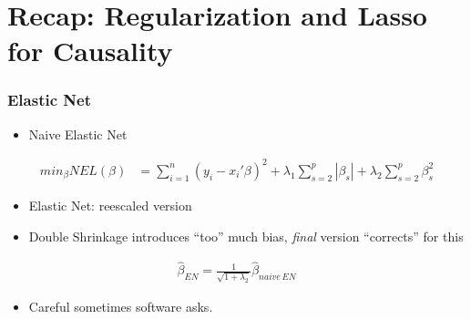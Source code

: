 \documentclass[
  shownotes,
  xcolor={svgnames},
  hyperref={colorlinks,citecolor=DarkBlue,linkcolor=DarkRed,urlcolor=DarkBlue}
  , aspectratio=169]{beamer}
\begin{document}
\section{Recap: Regularization and Lasso for Causality }
\begin{frame}[fragile]
\frametitle{Elastic Net}

\begin{itemize}
\item Naive Elastic Net
\end{itemize}

\begin{align}
min_{\beta} NEL(\beta) &= \sum_{i=1}^n (y_i-x_i'\beta)^2 + \lambda_1 \sum_{s=2}^p |\beta_s| + \lambda_2 \sum_{s=2}^p \beta_s^2 
\end{align}

\begin{itemize}
\item Elastic Net: reescaled version
\item Double Shrinkage introduces ``too'' much bias, {\it final} version ``corrects'' for this
\end{itemize}
\bigskip
\begin{align}
\hat{\beta}_{EN}= \frac{1}{\sqrt{1+\lambda_2}}\hat{\beta}_{naive\,EN}
\end{align}
\bigskip
\begin{itemize}
  \item Careful sometimes software asks.
\end{itemize}



\end{frame}
\end{document}
